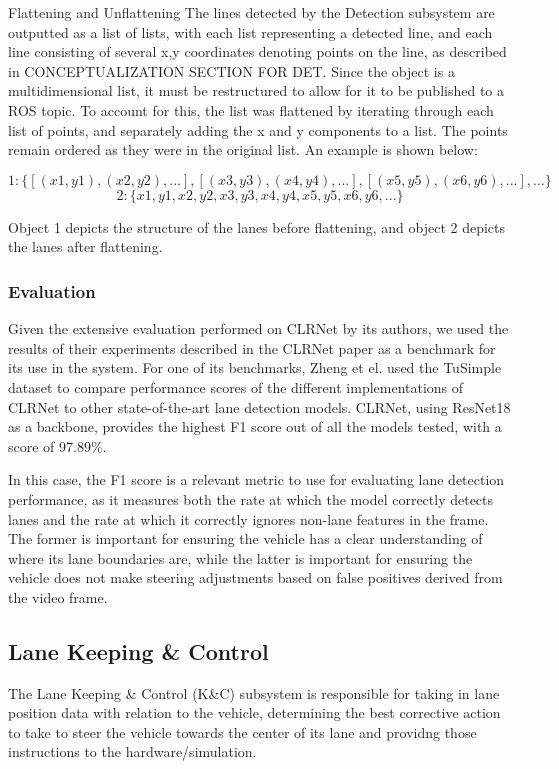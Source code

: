 \documentclass[titlepage,draft]{article}
\begin{document}
{Flattening and Unflattening
The lines detected by the Detection subsystem are outputted as a list of lists, with each list representing a detected line, and each line consisting of several x,y coordinates denoting points on the line, as described in CONCEPTUALIZATION SECTION FOR DET. Since the object is a multidimensional list, it must be restructured to allow for it to be published to a ROS topic. To account for this, the list was flattened by iterating through each list of points, and separately adding the x and y components to a list. The points remain ordered as they were in the original list. An example is shown below:

\[ 1: \{[(x1, y1), (x2, y2), ...], [(x3, y3), (x4, y4), ...], [(x5, y5), (x6, y6), ...], ...\} \]
\[ 2: \{x1, y1, x2, y2, x3, y3, x4, y4, x5, y5, x6, y6, ...\} \]

Object 1 depicts the structure of the lanes before flattening, and object 2 depicts the lanes after flattening.



\subsubsection{Evaluation}



Given the extensive evaluation performed on CLRNet by its authors, we used the results of their experiments described in
the CLRNet paper \cite{zheng2022clrnet} as a benchmark for its use in the system.
For one of its benchmarks, Zheng et el. used the TuSimple dataset to compare performance scores of the different implementations
of CLRNet to other state-of-the-art lane detection models.
CLRNet, using ResNet18 as a backbone, provides the highest F1 score out of all the models tested, with a score of 97.89\%.

In this case, the F1 score is a relevant metric to use for evaluating lane detection performance, as it measures both
the rate at which the model correctly detects lanes and the rate at which it correctly ignores non-lane features in the frame.
The former is important for ensuring the vehicle has a clear understanding of where its lane boundaries are, while the latter
is important for ensuring the vehicle does not make steering adjustments based on false positives derived from the video frame.

\subsection{Lane Keeping \& Control}
The Lane Keeping \& Control (K\&C) subsystem is responsible for taking in lane position data with relation to the vehicle, determining the best corrective action to take to steer the vehicle towards the center of its lane and providng those instructions to the hardware/simulation.

}
\end{document}
